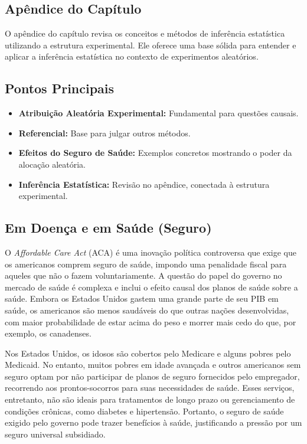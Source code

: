 \documentclass[a4paper,12pt]{article}[abntex2]
\begin{document}
\subsection*{Apêndice do Capítulo}
O apêndice do capítulo revisa os conceitos e métodos de inferência estatística utilizando a estrutura experimental. Ele oferece uma base sólida para entender e aplicar a inferência estatística no contexto de experimentos aleatórios.

\subsection*{Pontos Principais}
\begin{itemize}
    \item \textbf{Atribuição Aleatória Experimental:} Fundamental para questões causais.
    \item \textbf{Referencial:} Base para julgar outros métodos.
    \item \textbf{Efeitos do Seguro de Saúde:} Exemplos concretos mostrando o poder da alocação aleatória.
    \item \textbf{Inferência Estatística:} Revisão no apêndice, conectada à estrutura experimental.
\end{itemize}


\subsection{Em Doença e em Saúde (Seguro)}

O \textit{Affordable Care Act} (ACA) é uma inovação política controversa que exige que os americanos comprem seguro de saúde, impondo uma penalidade fiscal para aqueles que não o fazem voluntariamente. A questão do papel do governo no mercado de saúde é complexa e inclui o efeito causal dos planos de saúde sobre a saúde. Embora os Estados Unidos gastem uma grande parte de seu PIB em saúde, os americanos são menos saudáveis do que outras nações desenvolvidas, com maior probabilidade de estar acima do peso e morrer mais cedo do que, por exemplo, os canadenses.

Nos Estados Unidos, os idosos são cobertos pelo Medicare e alguns pobres pelo Medicaid. No entanto, muitos pobres em idade avançada e outros americanos sem seguro optam por não participar de planos de seguro fornecidos pelo empregador, recorrendo aos prontos-socorros para suas necessidades de saúde. Esses serviços, entretanto, não são ideais para tratamentos de longo prazo ou gerenciamento de condições crônicas, como diabetes e hipertensão. Portanto, o seguro de saúde exigido pelo governo pode trazer benefícios à saúde, justificando a pressão por um seguro universal subsidiado.
\end{document}
